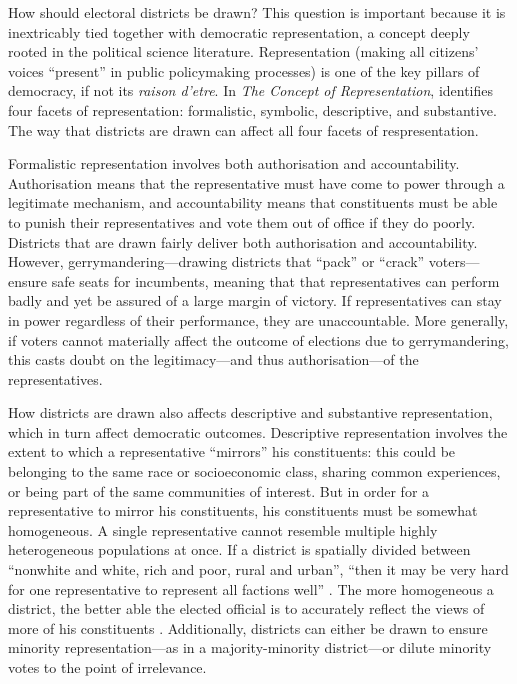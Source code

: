 \documentclass[]{article}
\begin{document}
How should electoral districts be drawn? This question is important
because it is inextricably tied together with democratic representation,
a concept deeply rooted in the political science literature.
Representation (making all citizens' voices ``present'' in public
policymaking processes) is one of the key pillars of democracy, if not
its \emph{raison d'etre}. In \emph{The Concept of Representation},
\cite{pitkin} identifies four facets of representation: formalistic,
symbolic, descriptive, and substantive. The way that districts are drawn
can affect all four facets of respresentation.

Formalistic representation involves both authorisation and
accountability. Authorisation means that the representative must have
come to power through a legitimate mechanism, and accountability means
that constituents must be able to punish their representatives and vote
them out of office if they do poorly. Districts that are drawn fairly
deliver both authorisation and accountability. However,
gerrymandering---drawing districts that ``pack'' or ``crack''
voters---ensure safe seats for incumbents, meaning that that
representatives can perform badly and yet be assured of a large margin
of victory. If representatives can stay in power regardless of their
performance, they are unaccountable. More generally, if voters cannot
materially affect the outcome of elections due to gerrymandering, this
casts doubt on the legitimacy---and thus authorisation---of the
representatives.

How districts are drawn also affects descriptive and substantive
representation, which in turn affect democratic outcomes. Descriptive
representation involves the extent to which a representative ``mirrors''
his constituents: this could be belonging to the same race or
socioeconomic class, sharing common experiences, or being part of the
same communities of interest. But in order for a representative to
mirror his constituents, his constituents must be somewhat homogeneous.
A single representative cannot resemble multiple highly heterogeneous
populations at once. If a district is spatially divided between
``nonwhite and white, rich and poor, rural and urban'', ``then it may be
very hard for one representative to represent all factions well''
\citep{cain1984}. The more homogeneous a district, the better able the
elected official is to accurately reflect the views of more of his
constituents \citep{brunell2010}. Additionally, districts can either be
drawn to ensure minority representation---as in a majority-minority
district---or dilute minority votes to the point of irrelevance.
\end{document}
